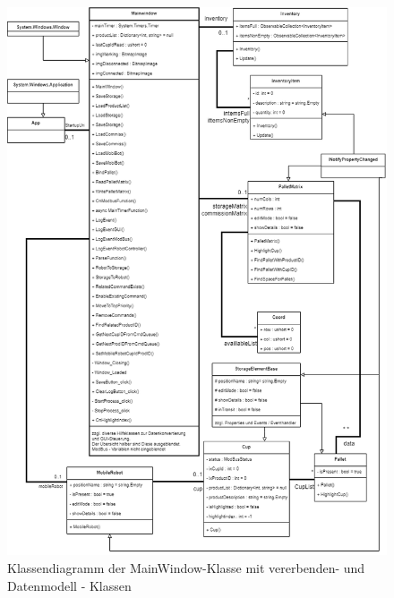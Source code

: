     \begin{figure}[h]
        \label{fig:figure2}
        \includegraphics[width = \textwidth ]{Bilder/LV_Klassendiagramm_Datenmodell}
        \caption[Klassendiagramm Datenmodells ]%
        {\small Klassendiagramm der MainWindow-Klasse mit vererbenden- und Datenmodell - Klassen }
        \centering
    \end{figure}

